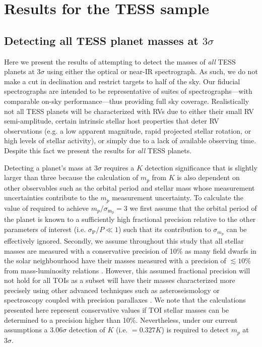\section{Results for the TESS sample} \label{sect:results}
\subsection{Detecting all TESS planet masses at $3\sigma$} \label{sect:all}
Here we present the results of attempting to detect the masses of \emph{all} TESS planets at $3\sigma$
using either the optical or near-IR spectrograph. As such, we do not make a cut in declination and restrict
targets to half of the sky. Our fiducial spectrographs are intended to be representative of suites of
spectrographs---with comparable on-sky performance---thus providing full sky coverage. 
Realistically not all TESS planets will
be characterized with RVs due to either their small RV semi-amplitude, certain intrinsic stellar
host properties that deter RV observations (e.g. a low apparent
magnitude, rapid projected stellar rotation, or high levels of stellar activity), or simply due to
a lack of available observing time. Despite this fact we present the results for \emph{all} TESS
planets.

Detecting a planet's mass at $3\sigma$ requires a $K$ detection significance that is slightly larger
than three because the calculation of $m_p$ from $K$ is also dependent on other observables such as the
orbital period and stellar mass whose measurement uncertainties contribute to the $m_p$ measurement uncertainty.
To calculate the value of \sigK{}
required to achieve $m_p / \sigma_{\text{m}_\text{p}}=3$ we first assume that the orbital period
of the planet is known to a sufficiently high fractional precision relative to the other parameters
of interest (i.e. $\sigma_{\text{P}}/P \ll 1$) such that its contribution to $\sigma_{m_p}$
can be effectively ignored. Secondly, we assume throughout this study
that all stellar masses are measured with a conservative 
precision of 10\% as many field dwarfs in the solar neighbourhood have their masses measured
with a precision of $\lesssim 10$\% from mass-luminosity relations \citep{delfosse00, torres10}.
However, this assumed fractional precision will not hold for all TOIs as a
subset will have their masses characterized more precisely using other advanced techniques such as
asteroseismology or spectroscopy coupled with precision parallaxes \citep[e.g.][]{vaneylen18,fulton18}.
We note that the calculations presented here represent conservative
values if TOI stellar masses can be determined to a precision higher than 10\%. 
Nevertheless, under our current assumptions a $3.06\sigma$ detection of $K$
(i.e. \sigK{} $=0.327 K$) is required to detect $m_p$ at $3\sigma$.

